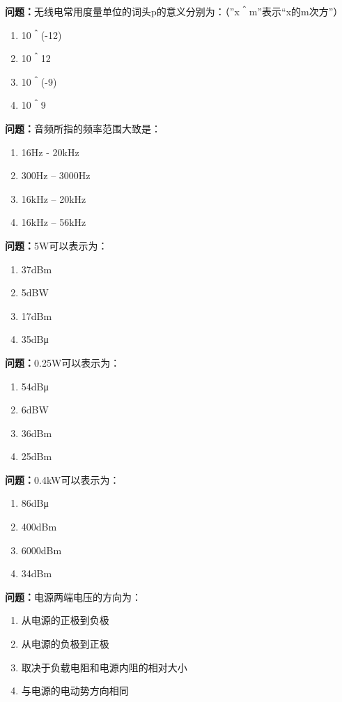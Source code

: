 \documentclass{ctexbook}
\begin{document}
\textbf{问题：}无线电常用度量单位的词头p的意义分别为：（”x＾m”表示“x的m次方”）
\begin{enumerate}[label=\Alph*), leftmargin=3em]
\item 10＾(-12)
\item 10＾12
\item 10＾(-9)
\item 10＾9
\end{enumerate}

\textbf{问题：}音频所指的频率范围大致是：
\begin{enumerate}[label=\Alph*), leftmargin=3em]
\item 16Hz - 20kHz
\item 300Hz – 3000Hz
\item 16kHz – 20kHz
\item 16kHz – 56kHz
\end{enumerate}

\textbf{问题：}5W可以表示为：
\begin{enumerate}[label=\Alph*), leftmargin=3em]
\item 37dBm
\item 5dBW
\item 17dBm
\item 35dBμ
\end{enumerate}

\textbf{问题：}0.25W可以表示为：
\begin{enumerate}[label=\Alph*), leftmargin=3em]
\item 54dBμ
\item 6dBW
\item 36dBm
\item 25dBm
\end{enumerate}

\textbf{问题：}0.4kW可以表示为：
\begin{enumerate}[label=\Alph*), leftmargin=3em]
\item 86dBμ
\item 400dBm
\item 6000dBm
\item 34dBm
\end{enumerate}

\textbf{问题：}电源两端电压的方向为：
\begin{enumerate}[label=\Alph*), leftmargin=3em]
\item 从电源的正极到负极
\item 从电源的负极到正极
\item 取决于负载电阻和电源内阻的相对大小
\item 与电源的电动势方向相同
\end{enumerate}
\end{document}
